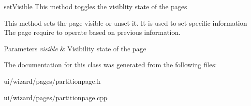 set\+Visible This method toggles the visiblity state of the pages 

This method sets the page visible or unset it. It is used to set specific information The page require to operate based on previous information. 
\begin{DoxyParams}{Parameters}
{\em visible} & Visibility state of the page \\
\hline
\end{DoxyParams}


The documentation for this class was generated from the following files\+:\begin{DoxyCompactItemize}
\item 
ui/wizard/pages/partitionpage.\+h\item 
ui/wizard/pages/partitionpage.\+cpp\end{DoxyCompactItemize}
